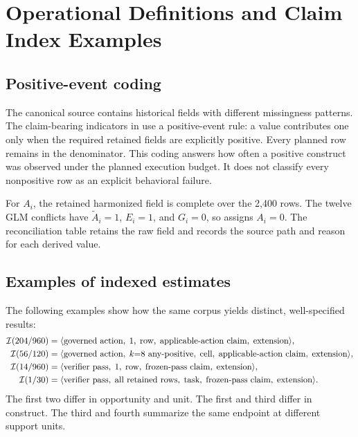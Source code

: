 \section{Operational Definitions and Claim Index Examples}
\label{app:definitions}



\subsection{Positive-event coding}

The canonical source contains historical fields with different missingness patterns. The claim-bearing indicators in  use a positive-event rule: a value contributes one only when the required retained fields are explicitly positive. Every planned row remains in the denominator. This coding answers how often a positive construct was observed under the planned execution budget. It does not classify every nonpositive row as an explicit behavioral failure.

For $A_i$, the retained harmonized field is complete over the 2,400 rows. The twelve GLM conflicts have $\widetilde A_i=1$, $E_i=1$, and $G_i=0$, so  assigns $A_i=0$. The reconciliation table retains the raw field and records the source path and reason for each derived value.

\subsection{Examples of indexed estimates}

The following examples show how the same corpus yields distinct, well-specified results:
\begin{align*}
\mathcal{I}(204/960)
&=\langle \text{governed action},\;1,\;\text{row},\;\text{applicable-action claim},\;\text{extension}\rangle,\\
\mathcal{I}(56/120)
&=\langle \text{governed action},\;k{=}8\text{ any-positive},\;\text{cell},\;\text{applicable-action claim},\;\text{extension}\rangle,\\
\mathcal{I}(14/960)
&=\langle \text{verifier pass},\;1,\;\text{row},\;\text{frozen-pass claim},\;\text{extension}\rangle,\\
\mathcal{I}(1/30)
&=\langle \text{verifier pass},\;\text{all retained rows},\;\text{task},\;\text{frozen-pass claim},\;\text{extension}\rangle.
\end{align*}
The first two differ in opportunity and unit. The first and third differ in construct. The third and fourth summarize the same endpoint at different support units.

